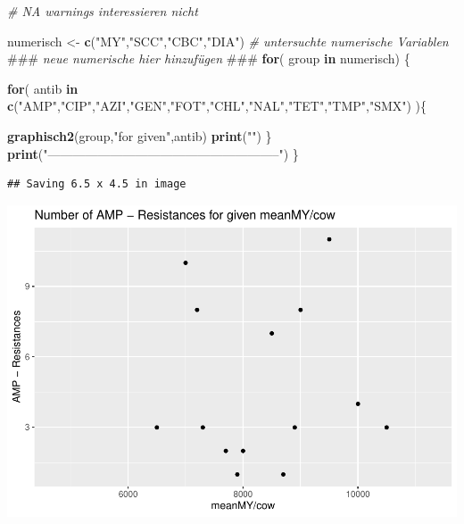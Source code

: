 \documentclass[
]{article}
\newenvironment{Shaded}{\begin{snugshade}}{\end{snugshade}}
\newcommand{\AlertTok}[1]{\textcolor[rgb]{0.94,0.16,0.16}{#1}}
\newcommand{\CommentTok}[1]{\textcolor[rgb]{0.56,0.35,0.01}{\textit{#1}}}
\newcommand{\ControlFlowTok}[1]{\textcolor[rgb]{0.13,0.29,0.53}{\textbf{#1}}}
\newcommand{\KeywordTok}[1]{\textcolor[rgb]{0.13,0.29,0.53}{\textbf{#1}}}
\newcommand{\NormalTok}[1]{#1}
\newcommand{\StringTok}[1]{\textcolor[rgb]{0.31,0.60,0.02}{#1}}
\begin{document}
\begin{Shaded}
\begin{Highlighting}[]
\CommentTok{#   NA warnings interessieren nicht}
 
\NormalTok{numerisch <-}\StringTok{ }\KeywordTok{c}\NormalTok{(}\StringTok{"MY"}\NormalTok{,}\StringTok{"SCC"}\NormalTok{,}\StringTok{"CBC"}\NormalTok{,}\StringTok{"DIA"}\NormalTok{)     }\CommentTok{# untersuchte numerische Variablen  }\AlertTok{###}\CommentTok{ neue numerische hier hinzufügen }\AlertTok{###}
\ControlFlowTok{for}\NormalTok{( group }\ControlFlowTok{in}\NormalTok{ numerisch) \{   }

  \ControlFlowTok{for}\NormalTok{( antib }\ControlFlowTok{in} \KeywordTok{c}\NormalTok{(}\StringTok{"AMP"}\NormalTok{,}\StringTok{"CIP"}\NormalTok{,}\StringTok{"AZI"}\NormalTok{,}\StringTok{"GEN"}\NormalTok{,}\StringTok{"FOT"}\NormalTok{,}\StringTok{"CHL"}\NormalTok{,}\StringTok{"NAL"}\NormalTok{,}\StringTok{"TET"}\NormalTok{,}\StringTok{"TMP"}\NormalTok{,}\StringTok{"SMX"}\NormalTok{) )\{ }
  
    \KeywordTok{graphisch2}\NormalTok{(group,}\StringTok{"for given"}\NormalTok{,antib)  }
    \KeywordTok{print}\NormalTok{(}\StringTok{""}\NormalTok{)}
\NormalTok{  \} }
  \KeywordTok{print}\NormalTok{(}\StringTok{"--------------------------------------------------------"}\NormalTok{)}
\NormalTok{\}}
\end{Highlighting}
\end{Shaded}

\begin{verbatim}
## Saving 6.5 x 4.5 in image
\end{verbatim}

\includegraphics{NResistenzen_files/figure-latex/numerical_variables-1.pdf}
\end{document}
